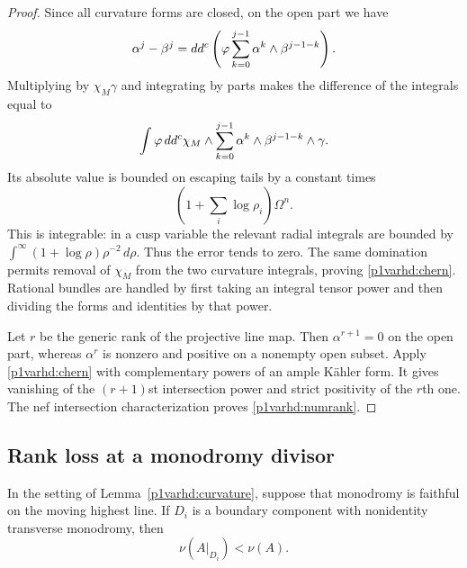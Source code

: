 \begin{proof}
Since all curvature forms are closed, on the open part we have
\[
 \alpha^j-\beta^j
 =dd^c\left(\varphi
       \sum_{k=0}^{j-1}\alpha^k\wedge\beta^{j-1-k}\right).
\]
Multiplying by $\chi_M\gamma$ and integrating by parts makes the
difference of the integrals equal to
\[
 \int\varphi\,dd^c\chi_M\wedge
       \sum_{k=0}^{j-1}\alpha^k\wedge\beta^{j-1-k}\wedge\gamma.
\]
Its absolute value is bounded on escaping tails by a constant times
\[
 \left(1+\sum_i\log\rho_i\right)\Omega^n.
\]
This is integrable: in a cusp variable the relevant radial
integrals are bounded by
$\int^{\infty}(1+\log\rho)\rho^{-2}\,d\rho$.
Thus the error tends to zero.  The same domination permits removal
of $\chi_M$ from the two curvature integrals, proving
\eqref{p1varhd:chern}.  Rational bundles are handled by first taking an
integral tensor power and then dividing the forms and identities
by that power.

Let $r$ be the generic rank of the projective line map.  Then
$\alpha^{r+1}=0$ on the open part, whereas $\alpha^r$ is nonzero
and positive on a nonempty open subset.  Apply \eqref{p1varhd:chern}
with complementary powers of an ample K\"ahler form.  It gives
vanishing of the $(r+1)$st intersection power and strict positivity
of the $r$th one.  The nef intersection characterization proves
\eqref{p1varhd:numrank}.
\end{proof}

\subsection{Rank loss at a monodromy divisor}

\begin{lemma}\label{p1varhd:boundary}
In the setting of Lemma~\ref{p1varhd:curvature}, suppose that monodromy
is faithful on the moving highest line.  If $D_i$ is a boundary
component with nonidentity transverse monodromy, then
\begin{equation}\label{p1varhd:strictdrop}
             \nu(A|_{D_i})<\nu(A).
\end{equation}
\end{lemma}


